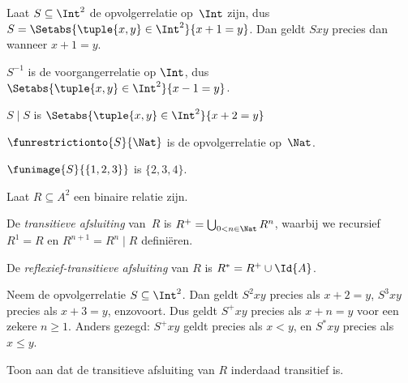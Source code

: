 \documentclass[openany]{memoir}
\begin{document}
\begin{ex}
Laat $S \subseteq \Int^2$ de opvolgerrelatie op~$\Int$ zijn, dus
$S = \Setabs{\tuple{x, y} \in \Int^2}{x + 1 = y}$. Dan geldt $Sxy$ precies
dan wanneer $x + 1 = y$.

$S^{-1}$ is de voorgangerrelatie op $\Int$, dus
$\Setabs{\tuple{x,y}\in\Int^2}{x -1 =y}$.

$S\mid S$ is
$ \Setabs{\tuple{x,y}\in\Int^2}{x + 2 =y}$

$\funrestrictionto{S}{\Nat}$ is de opvolgerrelatie op~$\Nat$.

$\funimage{S}{\{1,2,3\}}$ is $\{2, 3, 4\}$.
\end{ex}

\begin{defn}Laat $R \subseteq A^2$ een binaire relatie zijn.
	
De \emph{transitieve afsluiting} van~$R$ is $R^+ = \bigcup_{0 < n \in
\Nat} R^n$, waarbij we recursief $R^1 = R$ en $R^{n+1} = R^n
\mid R$ definiëren.

De \emph{reflexief-transitieve afsluiting} van $R$ is $R^* = R^+ \cup
\Id{A}$.
\end{defn}

\begin{ex}
Neem de opvolgerrelatie $S \subseteq \Int^2$. Dan geldt $S^2xy$ precies als
$x + 2 = y$, $S^3xy$ precies als $x + 3 = y$, enzovoort. Dus geldt $S^+xy$
precies als $x + n = y$ voor een zekere $n \geq 1$. Anders gezegd: $S^+xy$
geldt precies als $x < y$, en $S^*xy$ precies als $x \le y$.
\end{ex}

\begin{prob}
Toon aan dat de transitieve afsluiting van $R$ inderdaad transitief is.
\end{prob}
\endgroup
\OLEndChapterHook

\begingroup
\def\olfilename{OLP-0020}
\def\olfilepath{content/sets-functions-relations/functions/}
\hypertarget{unit-OLP-0020}{}



\endgroup
\end{document}
